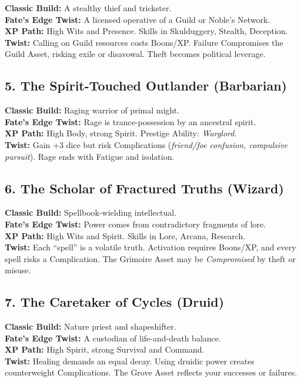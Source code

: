 \documentclass[11pt]{article}
\begin{document}
\textbf{Classic Build:} A stealthy thief and trickster.\\
\textbf{Fate’s Edge Twist:} A licensed operative of a Guild or Noble’s Network.\\
\textbf{XP Path:} High Wits and Presence. Skills in Skulduggery, Stealth, Deception.\\
\textbf{Twist:} Calling on Guild resources costs Boons/XP. Failure
Compromises the Guild Asset, risking exile or disavowal. Theft becomes political leverage.

\subsection{5. The Spirit-Touched Outlander (Barbarian)}

\textbf{Classic Build:} Raging warrior of primal might.\\
\textbf{Fate’s Edge Twist:} Rage is trance-possession by an ancestral spirit.\\
\textbf{XP Path:} High Body, strong Spirit. Prestige Ability: \emph{Warglord}.\\
\textbf{Twist:} Gain +3 dice but risk Complications
(\emph{friend/foe confusion, compulsive pursuit}). Rage ends with Fatigue and isolation.

\subsection{6. The Scholar of Fractured Truths (Wizard)}

\textbf{Classic Build:} Spellbook-wielding intellectual.\\
\textbf{Fate’s Edge Twist:} Power comes from contradictory fragments of lore.\\
\textbf{XP Path:} High Wits and Spirit. Skills in Lore, Arcana, Research.\\
\textbf{Twist:} Each “spell” is a volatile truth. Activation requires Boons/XP,
and every spell risks a Complication. The Grimoire Asset may be
\emph{Compromised} by theft or misuse.

\subsection{7. The Caretaker of Cycles (Druid)}

\textbf{Classic Build:} Nature priest and shapeshifter.\\
\textbf{Fate’s Edge Twist:} A custodian of life-and-death balance.\\
\textbf{XP Path:} High Spirit, strong Survival and Command.\\
\textbf{Twist:} Healing demands an equal decay. Using druidic power creates
counterweight Complications. The Grove Asset reflects your successes or failures.
\end{document}
